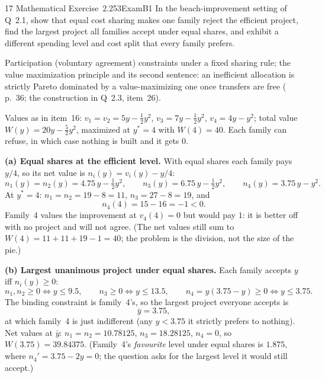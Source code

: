 \begin{exsol}{17}{\MR{} Mathematical Exercise~2.2}{53}{Exam}{B1}
\asked In the beach-improvement setting of Q~2.1, show that equal cost sharing makes one family
reject the efficient project, find the largest project all families accept under equal shares,
and exhibit a different spending level and cost split that every family prefers.

\method Participation (voluntary agreement) constraints under a fixed sharing rule; the value
maximization principle and its second sentence: an inefficient allocation is strictly
Pareto dominated by a value-maximizing one once transfers are free (\MR{} p.~36; the construction
in Q~2.3, item~26).

\solution
Values as in item~16: $v_1 = v_2 = 5y - \tfrac12 y^2$, $v_3 = 7y - \tfrac12 y^2$,
$v_4 = 4y - y^2$; total value $W(y) = 20y - \tfrac52 y^2$, maximized at $y^* = 4$ with $W(4) = 40$.
Each family can refuse, in which case nothing is built and it gets $0$.

\textbf{(a) Equal shares at the efficient level.} With equal shares each family pays $y/4$, so its
net value is $n_i(y) = v_i(y) - y/4$:
\[
  n_1(y) = n_2(y) = 4.75\,y - \tfrac12 y^2, \qquad n_3(y) = 6.75\,y - \tfrac12 y^2, \qquad
  n_4(y) = 3.75\,y - y^2 .
\]
At $y^* = 4$: $n_1 = n_2 = 19 - 8 = 11$, $n_3 = 27 - 8 = 19$, and
\[
  n_4(4) = 15 - 16 = -1 < 0 .
\]
Family~4 values the improvement at $v_4(4) = 0$ but would pay $1$: it is better off with no
project and will not agree. (The net values still sum to $W(4) = 11 + 11 + 19 - 1 = 40$; the problem
is the division, not the size of the pie.)

\textbf{(b) Largest unanimous project under equal shares.} Each family accepts $y$ iff
$n_i(y) \ge 0$:
\[
  n_1, n_2 \ge 0 \iff y \le 9.5, \qquad n_3 \ge 0 \iff y \le 13.5, \qquad
  n_4 = y(3.75 - y) \ge 0 \iff y \le 3.75 .
\]
The binding constraint is family~4's, so the largest project everyone accepts is
\[
  \bar y = 3.75 ,
\]
at which family~4 is just indifferent (any $y < 3.75$ it strictly prefers to nothing). Net values
at $\bar y$: $n_1 = n_2 = 10.78125$, $n_3 = 18.28125$, $n_4 = 0$, so
$W(3.75) = 39.84375$. (Family~4's \emph{favourite} level under equal shares is $1.875$, where
$n_4' = 3.75 - 2y = 0$; the question asks for the largest level it would still accept.)


\end{exsol}
